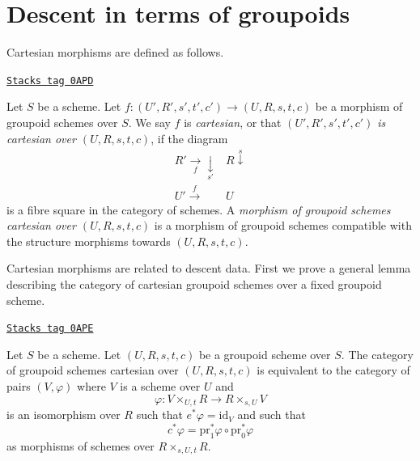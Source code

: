 \section{Descent in terms of groupoids}
\label{groupoids-section-groupoids-descent}
Cartesian morphisms are defined as follows.

\begin{definition}
\label{groupoids-definition-cartesian-morphism}
\href{https://stacks.math.columbia.edu/tag/0APD}{\texttt{Stacks tag 0APD}}

Let $S$ be a scheme. Let $f : (U', R', s', t', c') \to (U, R, s, t, c)$ be
a morphism of groupoid schemes over $S$. We say $f$ is {\it cartesian}, or
that {\it $(U', R', s', t', c')$ is cartesian over $(U, R, s, t, c)$},
if the diagram
$$
\begin{array}{cc}R' \underset{f}{\longrightarrow}\underset{s'}{\downarrow} & R \overset{s}{\downarrow} \\ U' \overset{f}{\longrightarrow} & U\end{array}
$$
is a fibre square in the category of schemes. A {\it morphism of groupoid
schemes cartesian over $(U, R, s, t, c)$} is a morphism of groupoid
schemes compatible with the structure morphisms towards $(U, R, s, t, c)$.
\end{definition}

Cartesian morphisms are related to descent data. First we prove a general
lemma describing the category of cartesian groupoid schemes over a
fixed groupoid scheme.

\begin{lemma}
\label{groupoids-lemma-characterize-cartesian-schemes}
\href{https://stacks.math.columbia.edu/tag/0APE}{\texttt{Stacks tag 0APE}}

Let $S$ be a scheme. Let $(U, R, s, t, c)$ be a groupoid scheme over $S$.
The category of groupoid schemes cartesian over $(U, R, s, t, c)$
is equivalent to the category of pairs $(V, \varphi)$ where $V$ is a
scheme over $U$ and
$$
\varphi :
V \times_{U, t} R
\longrightarrow
R \times_{s, U} V
$$
is an isomorphism over $R$ such that $e^*\varphi = \text{id}_V$ and such that
$$
c^*\varphi = \text{pr}_1^*\varphi \circ \text{pr}_0^*\varphi
$$
as morphisms of schemes over $R \times_{s, U, t} R$.
\end{lemma}

